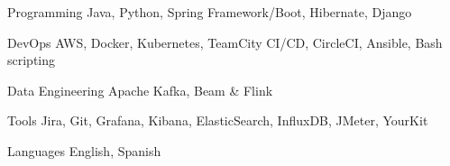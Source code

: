 

\begin{cvskills}

  \cvskill
    {Programming} %
    {Java, Python, Spring Framework/Boot, Hibernate, Django} %

  \cvskill
    {DevOps} %
    {AWS, Docker, Kubernetes, TeamCity CI/CD, CircleCI, Ansible, Bash scripting} %

  \cvskill
    {Data Engineering} %
    {Apache Kafka, Beam \& Flink} %


  \cvskill
    {Tools} %
    {Jira, Git, Grafana, Kibana, ElasticSearch, InfluxDB, JMeter, YourKit} %

  \cvskill
    {Languages} %
    {English, Spanish} %

\end{cvskills}